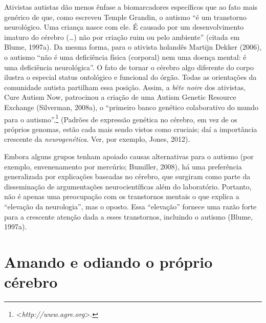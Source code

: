 Ativistas autistas dão menos ênfase a biomarcadores específicos que ao
fato mais genérico de que, como escreveu Temple Grandin, o autismo ``é
um transtorno neurológico. Uma criança nasce com ele. É causado por um
desenvolvimento imaturo do cérebro (\ldots{}) não por criação ruim ou pelo
ambiente'' (citada em Blume, 1997a). Da mesma forma, para o ativista
holandês Martijn Dekker (2006), o autismo ``não é uma deficiência física
(corporal) nem uma doença mental: é uma deficiência neurológica''. O
fato de tornar o cérebro algo diferente do corpo ilustra o especial
status ontológico e funcional do órgão. Todas as orientações da
comunidade autista partilham essa posição. Assim, a \emph{bête noire}
dos ativistas, Cure Autism Now, patrocinou a criação de uma Autism
Genetic Resource Exchange (Silverman, 2008a), o ``primeiro banco
genético colaborativo do mundo para o autismo''.\footnote[20]{\textless{}\emph{http://www.agre.org}\textgreater{}.}
(Padrões de expressão genética no cérebro, em vez de os próprios
genomas, estão cada mais sendo vistos como cruciais; daí a importância
crescente da \emph{neurogenética}. Ver, por exemplo, Jones, 2012).

Embora alguns grupos tenham apoiado causas alternativas para o autismo
(por exemplo, envenenamento por mercúrio; Bumiller, 2008), há uma
preferência generalizada por explicações baseadas no cérebro, que
surgiram como parte da disseminação de argumentações neurocientíficas
além do laboratório. Portanto, não é apenas uma preocupação com os
transtornos mentais o que explica a ``elevação da neurologia'', mas o
oposto. Essa ``elevação'' fornece uma razão forte para a crescente
atenção dada a esses transtornos, incluindo o autismo (Blume, 1997a).

\chapter{Amando e odiando o próprio cérebro}

